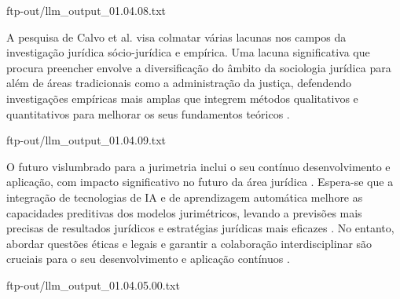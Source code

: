 \begin{agradecimentos}
    ftp-out/llm_output_01.04.08.txt 
    
    A pesquisa de Calvo et al. visa colmatar várias lacunas nos campos da investigação jurídica sócio-jurídica e empírica. Uma lacuna significativa que procura preencher envolve a diversificação do âmbito da sociologia jurídica para além de áreas tradicionais como a administração da justiça, defendendo investigações empíricas mais amplas que integrem métodos qualitativos e quantitativos para melhorar os seus fundamentos teóricos \cite{calvo2023}. 
    
    ftp-out/llm_output_01.04.09.txt 
    
    O futuro vislumbrado para a jurimetria inclui o seu contínuo desenvolvimento e aplicação, com impacto significativo no futuro da área jurídica \cite{silva2023role,nunes2016jurimetria}. Espera-se que a integração de tecnologias de IA e de aprendizagem automática melhore as capacidades preditivas dos modelos jurimétricos, levando a previsões mais precisas de resultados jurídicos e estratégias jurídicas mais eficazes \cite{silva2023role,nunes2016jurimetria}. No entanto, abordar questões éticas e legais e garantir a colaboração interdisciplinar são cruciais para o seu desenvolvimento e aplicação contínuos \cite{silva2023role,nunes2016jurimetria}. 
    
    ftp-out/llm_output_01.04.05.00.txt 
    

\end{agradecimentos}

